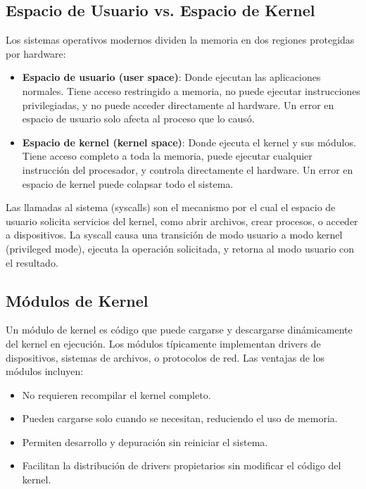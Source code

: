 \documentclass[conference]{IEEEtran}
\begin{document}
\subsection{Espacio de Usuario vs. Espacio de Kernel}

Los sistemas operativos modernos dividen la memoria en dos regiones protegidas por hardware:

\begin{itemize}
	\item \textbf{Espacio de usuario (user space)}: Donde ejecutan las aplicaciones normales. Tiene acceso restringido a memoria, no puede ejecutar instrucciones privilegiadas, y no puede acceder directamente al hardware. Un error en espacio de usuario solo afecta al proceso que lo causó.

	\item \textbf{Espacio de kernel (kernel space)}: Donde ejecuta el kernel y sus módulos. Tiene acceso completo a toda la memoria, puede ejecutar cualquier instrucción del procesador, y controla directamente el hardware. Un error en espacio de kernel puede colapsar todo el sistema.
\end{itemize}

Las llamadas al sistema (syscalls) son el mecanismo por el cual el espacio de usuario solicita servicios del kernel, como abrir archivos, crear procesos, o acceder a dispositivos. La syscall causa una transición de modo usuario a modo kernel (privileged mode), ejecuta la operación solicitada, y retorna al modo usuario con el resultado.

\subsection{Módulos de Kernel}

Un módulo de kernel es código que puede cargarse y descargarse dinámicamente del kernel en ejecución. Los módulos típicamente implementan drivers de dispositivos, sistemas de archivos, o protocolos de red. Las ventajas de los módulos incluyen:

\begin{itemize}
	\item No requieren recompilar el kernel completo.
	\item Pueden cargarse solo cuando se necesitan, reduciendo el uso de memoria.
	\item Permiten desarrollo y depuración sin reiniciar el sistema.
	\item Facilitan la distribución de drivers propietarios sin modificar el código del kernel.
\end{itemize}
\end{document}
